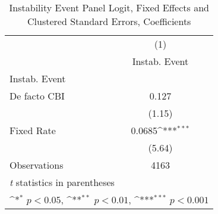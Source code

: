 \begin{table}[htbp]\centering
\def\sym#1{\ifmmode^{#1}\else\(^{#1}\)\fi}
\caption{Instability Event Panel Logit, Fixed Effects and Clustered Standard Errors, Coefficients \label{coeffsJustBinInstabEventDF}}
\begin{tabular}{l*{1}{c}}
\toprule
                                        &\multicolumn{1}{c}{(1)}\\
                                        &\multicolumn{1}{c}{Instab. Event}\\
\midrule
Instab. Event                           &                  \\
De facto CBI                            &    0.127         \\
                                        &   (1.15)         \\
\addlinespace
Fixed Rate                              &   0.0685\sym{***}\\
                                        &   (5.64)         \\
\midrule
Observations                            &     4163         \\
\bottomrule
\multicolumn{2}{l}{\footnotesize \textit{t} statistics in parentheses}\\
\multicolumn{2}{l}{\footnotesize \sym{*} \(p<0.05\), \sym{**} \(p<0.01\), \sym{***} \(p<0.001\)}\\
\end{tabular}
\end{table}
